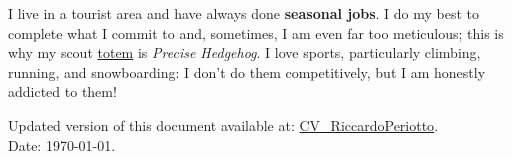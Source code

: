 \documentclass[11 pt,oneside,a4paper,titlepage]{article}
\begin{document}
{\begin{minipage}{11.3cm}

         I live in a tourist area and have always done \textbf{seasonal jobs}. I do my best to complete what I commit to and, sometimes, I am even far too meticulous; this is why my scout \href{https://it.wikipedia.org/wiki/Totem_(nome_scout)}{totem} is \textit{Precise Hedgehog}. I love sports, particularly climbing, running, and snowboarding: I don't do them competitively, but I am honestly addicted to them!      

        \vspace*{0.18cm}
        Updated version of this document available at: \href{https://riccardoperiotto.github.io/CV_RiccardoPeriotto.pdf}{CV\_RiccardoPeriotto}. \\
        Date: \today.
    \end{minipage}} %
\end{document}
